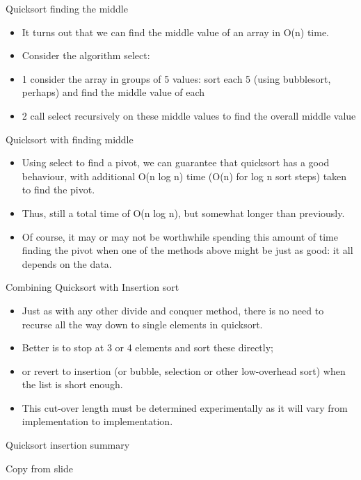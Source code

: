 \documentclass{beamer}
\begin{document}
\begin{frame}
Quicksort finding the middle

\begin{itemize}
\item It turns out that we can find the middle value of an array in O(n) time.
\item Consider the algorithm select:
\item 1 consider the array in groups of 5 values: sort each 5 (using bubblesort, perhaps) and find the middle value of
each
\item 2 call select recursively on these middle values to find the overall middle value
\end{itemize}

\end{frame} 

\begin{frame}

Quicksort with finding middle

\begin{itemize}
\item Using select to find a pivot, we can guarantee that quicksort has a good behaviour, with additional O(n log n)
time (O(n) for log n sort steps) taken to find the pivot.
\item Thus, still a total time of O(n log n), but somewhat longer than previously.
\item Of course, it may or may not be worthwhile spending this amount of time finding the pivot when one of the methods
above might be just as good: it all depends on the data.
\end{itemize}

\end{frame} \begin{frame}

Combining Quicksort with Insertion sort

\begin{itemize}
\item Just as with any other divide and conquer method, there is no need to recurse all the way down to single elements
in quicksort.
\item Better is to stop at 3 or 4 elements and sort these directly;
\item or revert to insertion (or bubble, selection or other low-overhead sort) when the list is short enough.
\item This cut-over length must be determined experimentally as it will vary from implementation to implementation.
\end{itemize}

\end{frame} \begin{frame}

Quicksort insertion summary

Copy from slide

\end{frame} 











 
\end{document}
